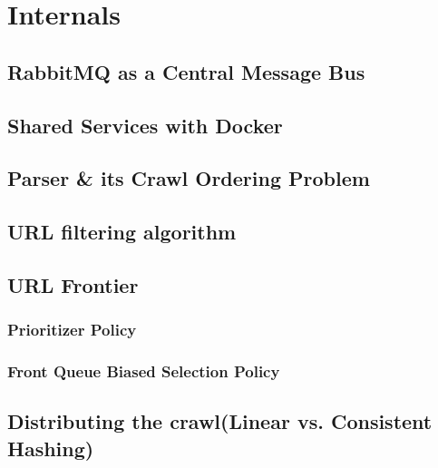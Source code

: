 \section{Internals}
\subsection{RabbitMQ as a Central Message Bus}
\subsection{Shared Services with Docker}
\subsection{Parser \& its Crawl Ordering Problem}
\subsection{URL filtering algorithm}
\subsection{URL Frontier}
\subsubsection{Prioritizer Policy}
\subsubsection{Front Queue Biased Selection Policy}
\subsection{Distributing the crawl(Linear vs. Consistent Hashing)}

\pagebreak
